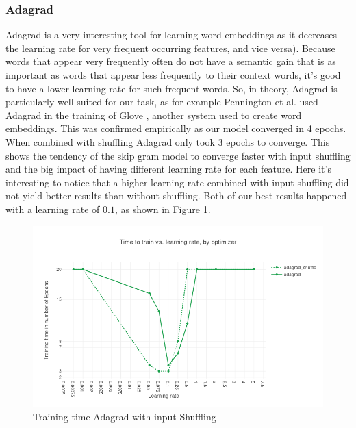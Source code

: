 \subsubsection{Adagrad}
Adagrad \cite{adagrad} is a very interesting tool for learning word embeddings as it decreases the learning rate for very frequent occurring features, and vice versa). Because words that appear very frequently often do not have a semantic gain that is as important as words that appear less frequently to their context words, it's good to have a lower learning rate for such frequent words. So, in theory, Adagrad is particularly well suited for our task, as for example Pennington et al. used Adagrad in the training of Glove \cite{glove}, another system used to create word embeddings.  This was confirmed empirically as our model converged in 4 epochs. When combined with shuffling Adagrad only took 3 epochs to converge. This shows the tendency of the skip gram model to converge faster with input shuffling and the big impact of having different learning rate for each feature.
Here it's interesting to notice that a higher learning rate combined with input shuffling did not yield better results than without shuffling. Both of our best results happened with a learning rate of $0.1$, as shown in Figure \ref{fig:results_adagrad_shuffle}.
\begin{figure}[h]
\centering
\includegraphics[scale=0.3]{images/results_adagrad_shuffle}
\caption{Training time Adagrad with input Shuffling}
\label{fig:results_adagrad_shuffle}
\end{figure}
